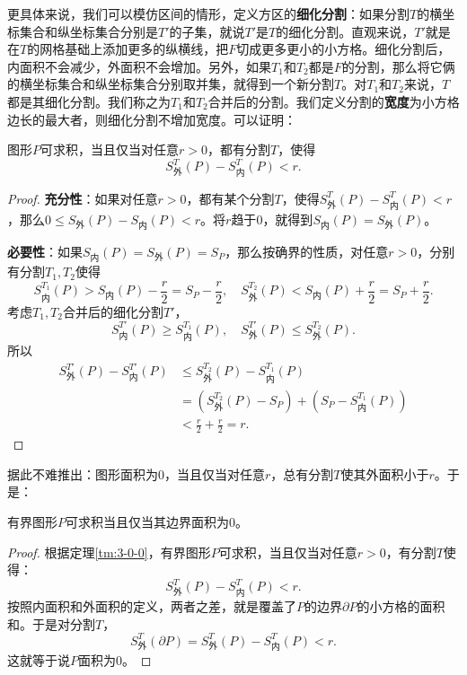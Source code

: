 \documentclass[12pt,UTF8]{ctexbook}
\begin{document}
更具体来说，我们可以模仿区间的情形，定义方区的\textbf{细化分割}：如果分割$T$的横坐标集合和纵坐标集合分别是$T'$的子集，就说$T'$是$T$的细化分割。直观来说，$T'$就是在$T$的网格基础上添加更多的纵横线，把$F$切成更多更小的小方格。细化分割后，内面积不会减少，外面积不会增加。另外，如果$T_1$和$T_2$都是$F$的分割，那么将它俩的横坐标集合和纵坐标集合分别取并集，就得到一个新分割$T$。对$T_1$和$T_2$来说，$T$都是其细化分割。我们称之为$T_1$和$T_2$合并后的分割。我们定义分割的\textbf{宽度}为小方格边长的最大者，则细化分割不增加宽度。可以证明：
\begin{tm}\label{tm:3-0-0}
    图形$P$可求积，当且仅当对任意$r>0$，都有分割$T$，使得
    $$ S_{\text{外}}^T(P) - S_{\text{内}}^T(P) < r.$$
\end{tm}
\begin{proof}
    \textbf{充分性}：如果对任意$r>0$，都有某个分割$T$，使得$S_{\text{外}}^T(P) - S_{\text{内}}^T(P) < r$，那么$0\leqslant S_{\text{外}} (P) - S_{\text{内}}(P) < r$。将$r$趋于$0$，就得到$S_{\text{内}} (P) = S_{\text{外}} (P)$。

    \textbf{必要性}：如果$S_{\text{内}} (P) = S_{\text{外}} (P) = S_P$，那么按确界的性质，对任意$r>0$，分别有分割$T_1,T_2$使得
    $$ S_{\text{内}}^{T_1}(P) > S_{\text{内}} (P)  - \frac{r}{2} = S_P - \frac{r}{2}, \quad S_{\text{外}}^{T_2}(P) < S_{\text{内}} (P)  + \frac{r}{2} = S_P + \frac{r}{2}. $$
    考虑$T_1,T_2$合并后的细化分割$T'$，
    $$ S_{\text{内}}^{T'}(P) \geqslant S_{\text{内}}^{T_1}(P), \quad S_{\text{外}}^{T'}(P) \leqslant S_{\text{外}}^{T_2}(P). $$
    所以
    \begin{align*}
        S_{\text{外}}^{T'}(P) - S_{\text{内}}^{T'}(P)&\leqslant S_{\text{外}}^{T_2}(P) - S_{\text{内}}^{T_1}(P) \\
        &= \left(S_{\text{外}}^{T_2}(P) - S_P\right) + \left(S_P - S_{\text{内}}^{T_1}(P)\right) \\
        &< \frac{r}{2} + \frac{r}{2} = r.
    \end{align*}
\end{proof}

据此不难推出：图形面积为$0$，当且仅当对任意$r$，总有分割$T$使其外面积小于$r$。于是：
\begin{tm}\label{tm:3-0-10}
    有界图形$P$可求积当且仅当其边界面积为$0$。
\end{tm}
\begin{proof}
    根据定理\ref{tm:3-0-0}，有界图形$P$可求积，当且仅当对任意$r>0$，有分割$T$使得：
    $$ S_{\text{外}}^T(P) - S_{\text{内}}^T(P) < r.$$
    按照内面积和外面积的定义，两者之差，就是覆盖了$P$的边界$\partial P$的小方格的面积和。于是对分割$T$，
    $$S_{\text{外}}^T(\partial P) = S_{\text{外}}^T(P) - S_{\text{内}}^T(P) < r.$$
    这就等于说$P$面积为$0$。
\end{proof}
\end{document}
